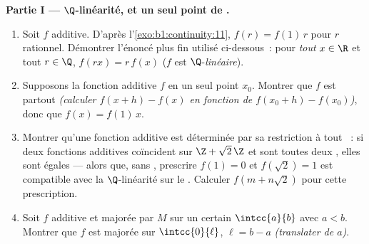 \begin{problem}[{Devoir maison --- $f(x + y) = f(x) + f(y)$~:
la régularité force la linéarité, et le portrait des monstres}]
\medskip
\noindent\textbf{Partie I --- $\Q$-linéarité, et un seul point de
.}
\begin{enumerate}
  \item Soit $f$ additive. D'après l'\cref{exo:b1:continuity:11},
        $f(r) = f(1)\,r$ pour $r$ rationnel. Démontrer l'énoncé
        plus fin utilisé ci-dessous~: pour \emph{tout} $x \in \R$
        et tout $r \in \Q$, $f(rx) = r\,f(x)$ ($f$ est
        $\Q$-\emph{linéaire}).
  \item Supposons la fonction additive $f$  en un seul
        point $x_0$. Montrer que $f$ est  partout
        \emph{(calculer $f(x + h) - f(x)$ en fonction de $f(x_0 +
        h) - f(x_0)$)}, donc que $f(x) = f(1)\,x$.
  \item Montrer qu'une fonction additive est déterminée par sa
        restriction à tout  ~: si deux fonctions
        additives coïncident sur $\Z + \sqrt2\,\Z$ et sont toutes
        deux , elles sont égales --- alors que, sans
        , prescrire $f(1) = 0$ et $f(\sqrt 2) = 1$ est
        compatible avec la $\Q$-linéarité sur le .
        Calculer $f(m + n\sqrt2)$ pour cette prescription.
  \item Soit $f$ additive et majorée par $M$ sur un certain
         $\intcc{a}{b}$ avec $a < b$. Montrer que $f$
        est majorée sur $\intcc{0}{\ell}$, $\ell = b - a$
        \emph{(translater de $a$)}.
\end{enumerate}


\end{problem}
